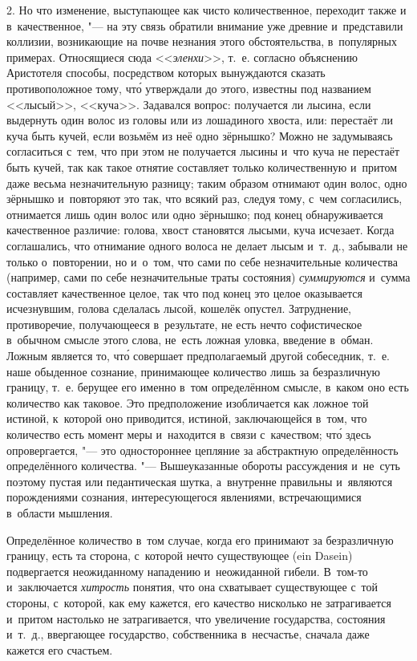 2. Но что изменение, выступающее как чисто количественное, переходит также и
в~качественное, "--- на эту связь обратили внимание уже древние и~представили
коллизии, возникающие на почве незнания этого обстоятельства, в~популярных
примерах. Относящиеся сюда <<{\em эленхи}>>, т.~е. согласно объяснению
Аристотеля способы, посредством которых вынуждаются сказать противоположное
тому, чт\'{о} утверждали до этого, известны под названием <<лысый>>, <<куча>>.
Задавался вопрос: получается ли лысина, если выдернуть один волос из головы или
из лошадиного хвоста, или: перестаёт ли куча быть кучей, если возьмём из неё
одно зёрнышко? Можно не задумываясь согласиться с~тем, что при этом не
получается лысины и~что куча не перестаёт быть кучей, так как такое отнятие
составляет только количественную и~притом даже весьма незначительную разницу;
таким образом отнимают один волос, одно зёрнышко и~повторяют это так, что
всякий раз, следуя тому, с~чем согласились, отнимается лишь один волос или одно
зёрнышко; под конец обнаруживается качественное различие: голова, хвост
становятся лысыми, куча исчезает. Когда соглашались, что отнимание одного
волоса не делает лысым и~т.~д., забывали не только о~повторении, но и~о~том,
что сами по себе незначительные количества (например, сами по себе
незначительные траты состояния) {\em суммируются} и~сумма составляет
качественное целое, так что под конец это целое оказывается исчезнувшим, голова
сделалась лысой, кошелёк опустел. Затруднение, противоречие, получающееся
в~результате, не есть нечто софистическое в~обычном смысле этого слова, не~есть
ложная уловка, введение в~обман. Ложным является то, чт\'{о} совершает
предполагаемый другой собеседник, т.~е. наше обыденное сознание, принимающее
количество лишь за безразличную границу, т.~е. берущее его именно в~том
определённом смысле, в~каком оно есть количество как таковое. Это предположение
изобличается как ложное той истиной, к~которой оно приводится, истиной,
заключающейся в~том, что количество есть момент меры и~находится в~связи
с~качеством; чт\'{о} здесь опровергается, "--- это одностороннее цепляние за
абстрактную определённость определённого количества. "--- Вышеуказанные
обороты рассуждения и~не~суть поэтому пустая или педантическая шутка,
а~внутренне правильны и~являются порождениями сознания, интересующегося
явлениями, встречающимися в~области мышления.

Определённое количество в~том случае, когда его принимают за безразличную
границу, есть та сторона, с~которой нечто существующее (ein Dasein)
подвергается неожиданному нападению и~неожиданной гибели. В~том-то
и~заключается {\em хитрость} понятия, что она схватывает существующее с~той
стороны, с~которой, как ему кажется, его качество нисколько не затрагивается
и~притом настолько не затрагивается, что увеличение государства, состояния
и~т.~д., ввергающее государство, собственника в~несчастье, сначала даже кажется
его счастьем.

